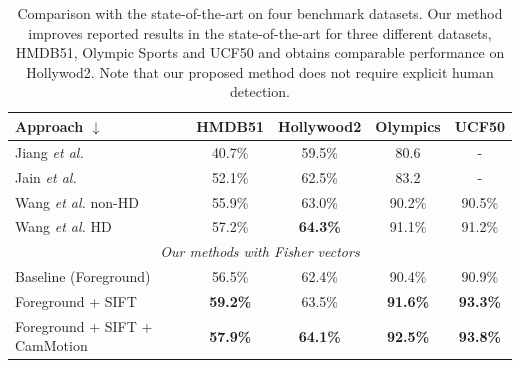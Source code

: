 \documentclass[runningheads]{llncs}
\begin{document}
\begin{table}[!h]
\caption{Comparison with the state-of-the-art on four benchmark datasets. Our method improves reported results in the state-of-the-art for three different datasets, HMDB51, Olympic Sports and UCF50 and obtains comparable performance on Hollywod2. Note that our proposed method does not require explicit human detection.}
\begin{center}
{
\begin{tabular}{ |l| c c c c| }
\hline
Approach $\downarrow$ & HMDB51 & Hollywood2 & Olympics & UCF50 \\
\hline
Jiang \emph{et al.} \cite{jiang2012} & 40.7\% & 59.5\% & 80.6 & - \\
Jain \emph{et al.} \cite{jain2013} & 52.1\% & 62.5\% & 83.2 & - \\
Wang \emph{et al.} \cite{wang2013} non-HD & 55.9\% & 63.0\% & 90.2\% & 90.5\% \\
Wang \emph{et al.} \cite{wang2013} HD & 57.2\% & \textbf{64.3\%} & 91.1\% & 91.2\% \\
\hline
\multicolumn{5}{|c|}{\textit{Our methods with Fisher vectors}} \\
\hline
Baseline (Foreground) & 56.5\% & 62.4\% & 90.4\% & 90.9\% \\
Foreground + SIFT & \textbf{59.2\%} & 63.5\% & \textbf{91.6\%} & \textbf{93.3\%} \\
Foreground + SIFT + CamMotion  & \textbf{57.9\%} & \textbf{64.1\%} & \textbf{92.5\%} & \textbf{93.8\%} \\
\hline
\end{tabular}
}
\end{center}
\label{tab:stateofart}
\end{table}
\end{document}
